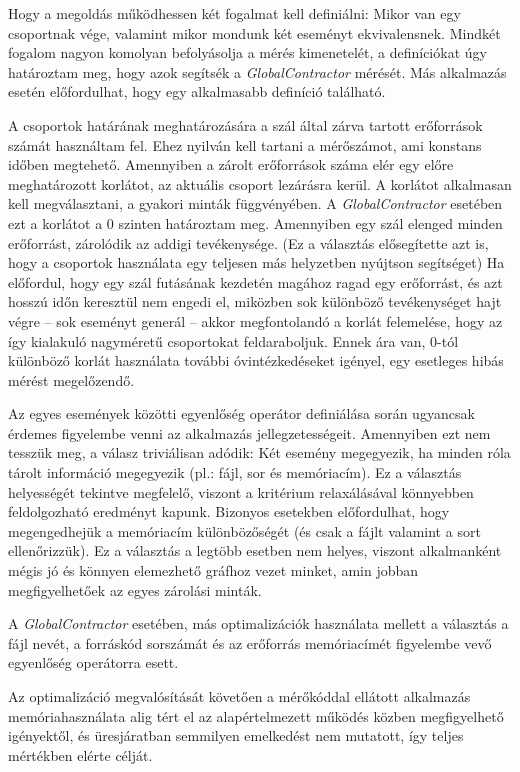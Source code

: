     Hogy a megoldás működhessen két fogalmat kell definiálni: Mikor van egy csoportnak vége, valamint mikor mondunk két eseményt ekvivalensnek. Mindkét fogalom nagyon komolyan befolyásolja a mérés kimenetelét, a definíciókat úgy határoztam meg, hogy azok segítsék a \emph{GlobalContractor} mérését. Más alkalmazás esetén előfordulhat, hogy egy alkalmasabb definíció található.
    
    A csoportok határának meghatározására a szál által zárva tartott erőforrások számát használtam fel. Ehez nyilván kell tartani a mérőszámot, ami konstans időben megtehető. Amennyiben a zárolt erőforrások száma elér egy előre meghatározott korlátot, az aktuális csoport lezárásra kerül. A korlátot alkalmasan kell megválasztani, a gyakori minták függvényében. A \emph{GlobalContractor} esetében ezt a korlátot a 0 szinten határoztam meg. Amennyiben egy szál elenged minden erőforrást, zárolódik az addigi tevékenysége. (Ez a választás elősegítette azt is, hogy a csoportok használata egy teljesen más helyzetben nyújtson segítséget) Ha előfordul, hogy egy szál futásának kezdetén magához ragad egy erőforrást, és azt hosszú időn keresztül nem engedi el, miközben sok különböző tevékenységet hajt végre -- sok eseményt generál -- akkor megfontolandó a korlát felemelése, hogy az így kialakuló nagyméretű csoportokat feldaraboljuk. Ennek ára van, 0-tól különböző korlát használata további óvintézkedéseket igényel, egy esetleges hibás mérést megelőzendő.
    
    Az egyes események közötti egyenlőség operátor definiálása során ugyancsak érdemes figyelembe venni az alkalmazás jellegzetességeit. Amennyiben ezt nem tesszük meg, a válasz triviálisan adódik: Két esemény megegyezik, ha minden róla tárolt információ megegyezik (pl.: fájl, sor és memóriacím). Ez a választás helyességét tekintve megfelelő, viszont a kritérium relaxálásával könnyebben feldolgozható eredményt kapunk. Bizonyos esetekben előfordulhat, hogy megengedhejük a memóriacím különbözőségét (és csak a fájlt valamint a sort ellenőrizzük). Ez a választás a legtöbb esetben nem helyes, viszont alkalmanként mégis jó és könnyen elemezhető gráfhoz vezet minket, amin jobban megfigyelhetőek az egyes zárolási minták.
    
    A \emph{GlobalContractor} esetében, más optimalizációk használata mellett a választás a fájl nevét, a forráskód sorszámát és az erőforrás memóriacímét figyelembe vevő egyenlőség operátorra esett.
    
    Az optimalizáció megvalósítását követően a mérőkóddal ellátott alkalmazás memóriahasználata alig tért el az alapértelmezett működés közben megfigyelhető igényektől, és üresjáratban semmilyen emelkedést nem mutatott, így teljes mértékben elérte célját.
    
